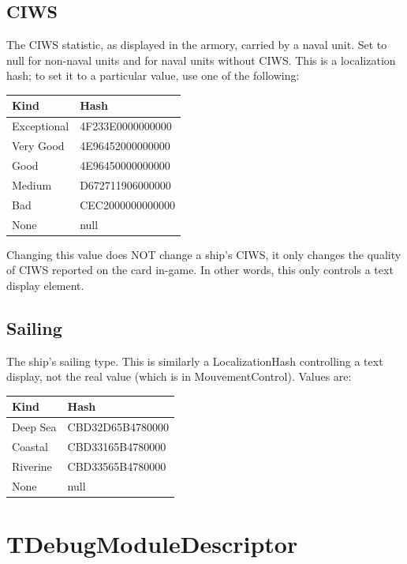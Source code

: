 \documentclass{article}
\begin{document}
\subsection{CIWS}

The CIWS statistic, as displayed in the armory, carried by a naval unit. Set to null for non-naval units and for naval units without CIWS. This is a localization hash; to set it to a particular value, use one of the following:

\begin{center}
    \begin{tabular}{ | l | l |}
    \hline
	Kind & Hash\\ \hline
	Exceptional & 4F233E0000000000\\
	Very Good & 4E96452000000000\\
	Good & 4E96450000000000\\
	Medium & D672711906000000\\
	Bad & CEC2000000000000\\
	None & null\\
    \hline
    \end{tabular}
\end{center}

Changing this value does NOT change a ship's CIWS, it only changes the quality of CIWS reported on the card in-game. In other words, this only controls a text display element.

\subsection{Sailing}

The ship's sailing type. This is similarly a LocalizationHash controlling a text display, not the real value (which is in MouvementControl). Values are:

\begin{center}
    \begin{tabular}{ | l | l |}
    \hline
	Kind & Hash\\ \hline
	Deep Sea & CBD32D65B4780000\\
	Coastal & CBD33165B4780000\\
	Riverine & CBD33565B4780000\\
	None & null\\
    \hline
    \end{tabular}
\end{center}

\section{TDebugModuleDescriptor}
\end{document}
